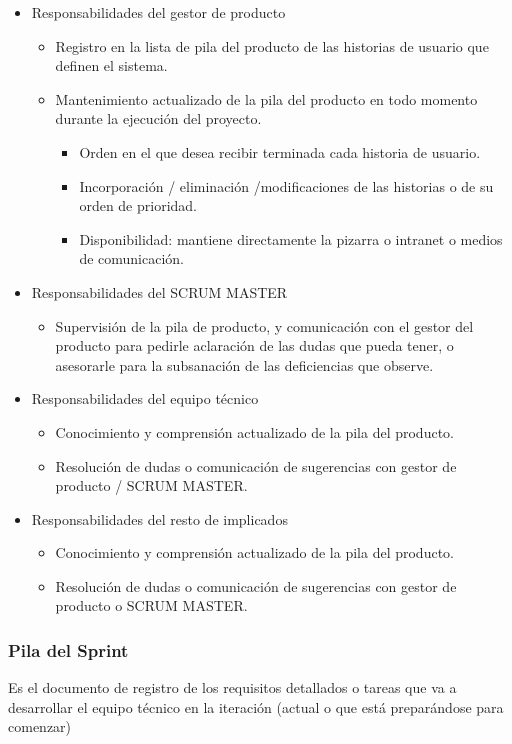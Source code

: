 \begin{itemize}
	\item Responsabilidades del gestor de producto
	\begin{itemize}
		\item Registro en la lista de pila del producto de las historias de usuario que definen el sistema.
 		\item Mantenimiento actualizado de la pila del producto en todo momento durante la ejecución del proyecto.
 		\begin{itemize}
			\item Orden en el que desea recibir terminada cada historia de usuario.
			\item Incorporación / eliminación /modificaciones de las historias o de su orden de prioridad.
			\item Disponibilidad: mantiene directamente la pizarra o intranet o medios de comunicación.
		\end{itemize}
	\end{itemize}
	\item Responsabilidades del SCRUM MASTER
	\begin{itemize}
		\item	Supervisión de la pila de producto, y comunicación con el gestor del producto para pedirle aclaración de las dudas que pueda tener, o asesorarle para la subsanación de las deficiencias que observe.
	\end{itemize}
	\item Responsabilidades del equipo técnico
	\begin{itemize}
		\item	Conocimiento y comprensión actualizado de la pila del producto. 
		\item	Resolución de dudas o comunicación de sugerencias con gestor de producto / SCRUM MASTER.
	\end{itemize}	
	\item Responsabilidades del resto de implicados
	\begin{itemize}
		\item Conocimiento y comprensión actualizado de la pila del producto.
		\item Resolución de dudas o comunicación de sugerencias con gestor de producto o SCRUM MASTER.
	\end{itemize}
\end{itemize}	

\subsubsection{Pila del Sprint}
\hspace*{2em}Es el documento de registro de los requisitos detallados o tareas que va a desarrollar el equipo técnico en la iteración (actual o que está preparándose para comenzar)
	
